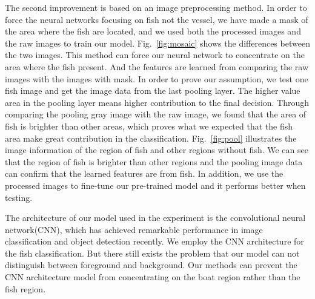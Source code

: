 \documentclass[conference]{IEEEtran}
\begin{document}
The second improvement is based on an image preprocessing method. In order to force the neural networks focusing on fish not the vessel, we have made a mask of the area where the fish are located, and we used both the processed images and the raw images to train our model. Fig.~\ref{fig:mosaic} shows the differences between the two images. This method can force our neural network to concentrate on the area where the fish present. And the features are learned from comparing the raw images with the images with mask. In order to prove our assumption, we test one fish image  and get the image data from the last pooling layer. The higher value area in the pooling layer means higher contribution to the final decision. Through comparing the pooling gray image with the raw image, we found that the area of fish is brighter than other areas, which proves what we expected that the fish area make great contribution in the classification. Fig.~\ref{fig:pool} illustrates the image information of the region of fish and other regions without fish. We can see that the region of fish is brighter than other regions and the pooling image data can confirm that the learned features are from fish. In addition, we use the processed images to fine-tune our pre-trained model and it performs better when testing.\par
The architecture of our model used in the experiment is the convolutional neural network(CNN), which has achieved remarkable performance in image classification and object detection recently. We employ the CNN architecture for the fish classification. But there still exists the problem that our model can not distinguish between foreground and background. Our methods can prevent the CNN architecture model from concentrating on the boat region rather than the fish region.
\end{document}
